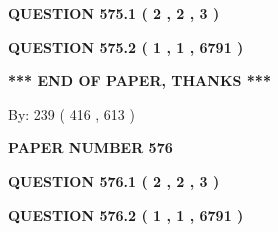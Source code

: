 \documentclass[12pt]{article}
\begin{document}
   
   
   
 \vspace{0.2in}
 
 
 
 
   
   
  
\vspace{0.2in}
  
{\textbf{\Large{QUESTION
575.1 
 ( 2 , 2 , 3 )
}}}
  
  
  
\vspace{0.2in}
  
{\textbf{\Large{QUESTION
575.2 
 ( 1 , 1 , 6791 )
}}}
  
  
   
   
 \vspace{0.2in}
 
   
   
   
   
\vspace{1.0in} 
{\textbf{\large{ *** END OF PAPER, THANKS *** }}} 
   
   
\hspace{1.0in} By: 
 239 ( 416 ,  613 )
   
   
   
   
\newpage 
\setcounter{page}{ 
   576001 } 
   
   
   
   
 {\textbf{ \Large{ PAPER NUMBER  576  }}}
   
   
\vspace{0.2in}
   
   
   
   
   
   
 \vspace{0.2in}
 
 
 
 
   
   
  
\vspace{0.2in}
  
{\textbf{\Large{QUESTION
576.1 
 ( 2 , 2 , 3 )
}}}
  
  
  
\vspace{0.2in}
  
{\textbf{\Large{QUESTION
576.2 
 ( 1 , 1 , 6791 )
}}}
  
  
   
   
 \vspace{0.2in}
 
\end{document}
